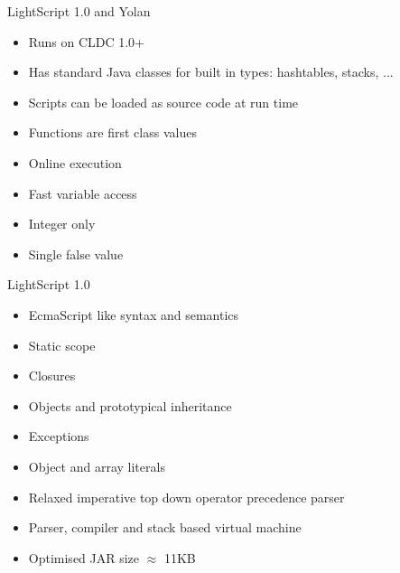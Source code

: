 \documentclass[a4paper,landscape]{slides}
\begin{document}
\begin{slide}
	{\large 
            LightScript 1.0 and Yolan
	\\ \mbox{}}
	\begin{itemize} \addtolength{\itemsep}{-\baselineskip}
            \item Runs on CLDC 1.0+
            \item Has standard Java classes for built in types: hashtables, stacks, ...
            \item Scripts can be loaded as source code at run time
            \item Functions are first class values
            \item Online execution
            \item Fast variable access
            \item Integer only
            \item Single false value 
	\end{itemize}
\end{slide}

\begin{slide}
	{\large 
            LightScript 1.0
	\\ \mbox{}}
	\begin{itemize} \addtolength{\itemsep}{-\baselineskip}
            \item EcmaScript like syntax and semantics
            \item Static scope
            \item Closures
            \item Objects and prototypical inheritance 
            \item Exceptions
            \item Object and array literals
            \item Relaxed imperative top down operator precedence parser
            \item Parser, compiler and stack based virtual machine
            \item Optimised JAR size $\approx$ 11KB
	\end{itemize}
\end{slide}
\end{document}

